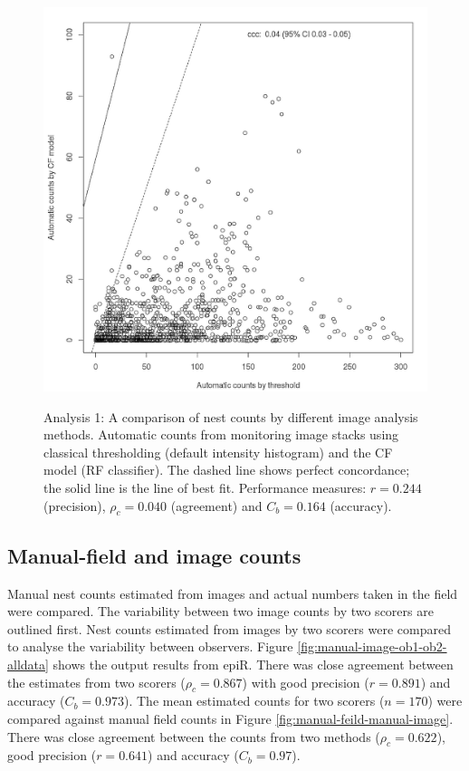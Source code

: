 \begin{figure}[!htbp]\myfloatalign
\includegraphics[width=1\linewidth]{gfx6/results/a1} \\
\caption[Automatic counts by threshold and model CF.]{Analysis 1: A comparison of nest counts by different image analysis methods. Automatic counts from monitoring image stacks using classical thresholding (default intensity histogram) and the CF model (RF classifier). The dashed line shows perfect concordance; the solid line is the line of best fit. Performance measures: $r = 0.244$ (precision), $\rho_{c} = 0.040$ (agreement) and $C_{b} = 0.164$ (accuracy).}\label{fig:automatic-thresh-c4}
\end{figure}

\clearpage

\subsection{Manual-field and image counts}\label{sec:manual-field-and-image-counts}
Manual nest counts estimated from images and actual numbers taken in the field were compared. The variability between two image counts by two scorers are outlined first. Nest counts estimated from images by two scorers were compared to analyse the variability between observers. Figure \ref{fig:manual-image-ob1-ob2-alldata} shows the output results from epiR. There was close agreement between the estimates from two scorers ($\rho_{c} = 0.867$) with good precision ($r = 0.891$) and accuracy ($C_{b} = 0.973$). The mean estimated counts for two scorers ($ n = 170 $) were compared against manual field counts in Figure \ref{fig:manual-feild-manual-image}. There was close agreement between the counts from two methods ($\rho_{c} = 0.622$), good precision ($r = 0.641$) and accuracy ($C_{b} = 0.97$).

